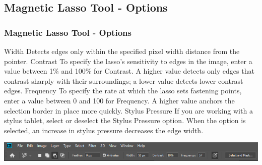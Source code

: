 \documentclass{beamer}
\begin{document}
\subsection{Magnetic Lasso Tool - Options}		
\begin{frame}
	\frametitle{Magnetic Lasso Tool - Options}
	\begin{outline}
		\1 Width
		\2 Detects edges only within the specified pixel width distance from the pointer. 
		\1 Contrast
		\2 To specify the lasso’s sensitivity to edges in the image, enter a value between 1\% and 100\% for Contrast. A higher value detects only edges that contrast sharply with their surroundings; a lower value detects lower-contrast edges.
		\1 Frequency
		\2 To specify the rate at which the lasso sets fastening points, enter a value between 0 and 100 for Frequency. A higher value anchors the selection border in place more quickly.
		\1 Stylus Pressure
		\2 If you are working with a stylus tablet, select or deselect the Stylus Pressure option. When the option is selected, an increase in stylus pressure decreases the edge width.
	\end{outline}
	\begin{center}
		\includegraphics[width = 1.0\textwidth]{images/Magnetic Lasso.png}
	\end{center}
\end{frame}



	
\end{document}
